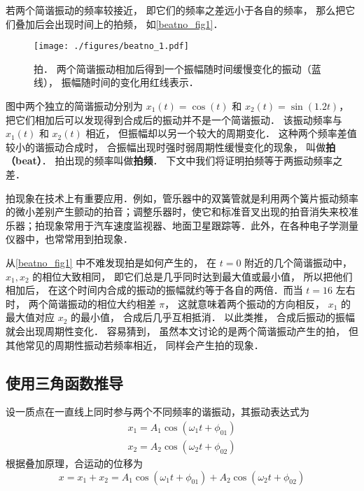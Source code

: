 

若两个简谐振动的频率较接近， 即它们的频率之差远小于各自的频率， 那么把它们叠加后会出现时间上的拍频， 如\autoref{beatno_fig1}．
\begin{figure}[ht]
\centering
\texttt{[image: ./figures/beatno\_1.pdf]}
\caption{拍． 两个简谐振动相加后得到一个振幅随时间缓慢变化的振动（蓝线）， 振幅随时间的变化用红线表示．} \label{beatno_fig1}
\end{figure}
图中两个独立的简谐振动分别为 $x_1(t) = \cos(t)$ 和 $x_2(t) = \sin(1.2t)$， 把它们相加后可以发现得到合成后的振动并不是一个简谐振动． 该振动频率与 $x_1(t)$ 和 $x_2(t)$ 相近， 但振幅却以另一个较大的周期变化． 这种两个频率差值较小的谐振动合成时， 合振幅出现时强时弱周期性缓慢变化的现象， 叫做\textbf{拍（beat）}． 拍出现的频率叫做\textbf{拍频}． 下文中我们将证明拍频等于两振动频率之差．

拍现象在技术上有重要应用．例如，管乐器中的双簧管就是利用两个簧片振动频率的微小差别产生颤动的拍音；调整乐器时，使它和标准音叉出现的拍音消失来校准乐器；拍现象常用于汽车速度监视器、地面卫星跟踪等．此外，在各种电子学测量仪器中，也常常用到拍现象．

从\autoref{beatno_fig1} 中不难发现拍是如何产生的， 在 $t = 0$ 附近的几个简谐振动中， $x_1, x_2$ 的相位大致相同， 即它们总是几乎同时达到最大值或最小值， 所以把他们相加后， 在这个时间内合成的振动的振幅就约等于各自的两倍．而当 $t = 16$ 左右时， 两个简谐振动的相位大约相差 $\pi$， 这就意味着两个振动的方向相反， $x_1$ 的最大值对应 $x_2$ 的最小值， 合成后几乎互相抵消． 以此类推， 合成后振动的振幅就会出现周期性变化．
容易猜到， 虽然本文讨论的是两个简谐振动产生的拍， 但其他常见的周期性振动若频率相近， 同样会产生拍的现象．

\subsection{使用三角函数推导}
设一质点在一直线上同时参与两个不同频率的谐振动，其振动表达式为
\begin{equation}
\begin{array}{l}x_{1}=A_{1} \cos \left(\omega_{1} t+\phi_{01}\right) \\ x_{2}=A_{2} \cos \left(\omega_{2} t+\phi_{02}\right)\end{array}
\end{equation}
根据叠加原理，合运动的位移为
\begin{equation}
x=x_{1}+x_{2}=A_{1} \cos \left(\omega_{1} t+\phi_{01}\right)+A_{2} \cos \left(\omega_{2} t+\phi_{02}\right)
\end{equation}

